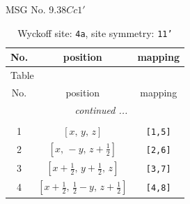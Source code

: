 \documentclass[fleqn,8pt]{jsarticle}
\begin{document}
\setcounter{MaxMatrixCols}{32}

\renewcommand{\tablename}{Table~}
\renewcommand{\figurename}{Figure~}
\begin{center}
\LARGE
MSG No. 9.38\quad$Cc1'$
\end{center}
\renewcommand{\arraystretch}{1.2}
\begin{longtable}{ccc}
\caption{Wyckoff site: {\tt 4a}, site symmetry: {\tt 11'}}
 \\
 \hline \hline
No. & position & mapping \\ \hline \endfirsthead

\multicolumn{2}{l}{\tablename\ \thetable{}} \\
 \hline \hline
No. & position & mapping \\ \hline \endhead

 \hline \hline
\multicolumn{2}{r}{\footnotesize\it continued ...} \\ \endfoot

 \hline \hline
\multicolumn{2}{r}{} \\ \endlastfoot

1 & $\left[ x,\, y,\, z \right]$ & {\tt [1,5]} \\ \hline
2 & $\left[ x,\, - y,\, z + \frac{1}{2} \right]$ & {\tt [2,6]} \\ \hline
3 & $\left[ x + \frac{1}{2},\, y + \frac{1}{2},\, z \right]$ & {\tt [3,7]} \\ \hline
4 & $\left[ x + \frac{1}{2},\, \frac{1}{2} - y,\, z + \frac{1}{2} \right]$ & {\tt [4,8]} \\
\end{longtable}
\end{document}
